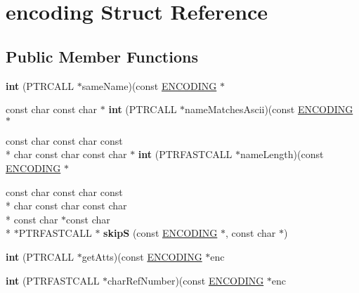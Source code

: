 \hypertarget{structencoding}{\section{encoding Struct Reference}
\label{structencoding}
}
\subsection*{Public Member Functions}
\begin{DoxyCompactItemize}
\item 
\hypertarget{structencoding_a92bcf4f50db1c279fc5eda73472d7202}{{\bfseries int} (P\-T\-R\-C\-A\-L\-L $\ast$same\-Name)(const \hyperlink{structencoding}{E\-N\-C\-O\-D\-I\-N\-G} $\ast$}\label{structencoding_a92bcf4f50db1c279fc5eda73472d7202}

\item 
\hypertarget{structencoding_a77b5f977505072990c8d0a710cc9e1fd}{const char const char $\ast$ {\bfseries int} (P\-T\-R\-C\-A\-L\-L $\ast$name\-Matches\-Ascii)(const \hyperlink{structencoding}{E\-N\-C\-O\-D\-I\-N\-G} $\ast$}\label{structencoding_a77b5f977505072990c8d0a710cc9e1fd}

\item 
\hypertarget{structencoding_a76792dbef2f157c76216dae48d233faf}{const char const char const \\*
char const char const char $\ast$ {\bfseries int} (P\-T\-R\-F\-A\-S\-T\-C\-A\-L\-L $\ast$name\-Length)(const \hyperlink{structencoding}{E\-N\-C\-O\-D\-I\-N\-G} $\ast$}\label{structencoding_a76792dbef2f157c76216dae48d233faf}

\item 
\hypertarget{structencoding_a997a21e1c95efd5497d359d43a2d1d17}{const char const char const \\*
char const char const char \\*
const char $\ast$const char \\*
$\ast$P\-T\-R\-F\-A\-S\-T\-C\-A\-L\-L $\ast$ {\bfseries skip\-S} (const \hyperlink{structencoding}{E\-N\-C\-O\-D\-I\-N\-G} $\ast$, const char $\ast$)}\label{structencoding_a997a21e1c95efd5497d359d43a2d1d17}

\item 
\hypertarget{structencoding_af6bcd2d5f3890fd0e22011c7441435b0}{{\bfseries int} (P\-T\-R\-C\-A\-L\-L $\ast$get\-Atts)(const \hyperlink{structencoding}{E\-N\-C\-O\-D\-I\-N\-G} $\ast$enc}\label{structencoding_af6bcd2d5f3890fd0e22011c7441435b0}

\item 
\hypertarget{structencoding_ab4567aa3fa8ce3d60ffacf0d8d90628c}{{\bfseries int} (P\-T\-R\-F\-A\-S\-T\-C\-A\-L\-L $\ast$char\-Ref\-Number)(const \hyperlink{structencoding}{E\-N\-C\-O\-D\-I\-N\-G} $\ast$enc}\label{structencoding_ab4567aa3fa8ce3d60ffacf0d8d90628c}


\end{DoxyCompactItemize}
